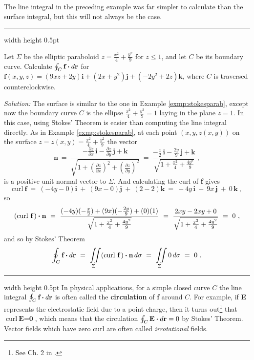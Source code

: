 The line integral in the preceding example was far simpler to calculate than the surface integral, but this will not
always be the case.

\vspace{3mm}
\hrule width \textwidth height 0.5pt
\begin{exmp}
 Let $\Sigma$ be the elliptic paraboloid $z=\frac{x^2}{4}+\frac{y^2}{9}$ for $z \le 1$, and let $C$ be its boundary
 curve.
 Calculate $\oint_{C} \textbf{f} \bm{\cdot} d\textbf{r}$ for $\textbf{f}(x,y,z)=(9xz+2y)\textbf{i}+(2x+y^2 )\textbf{j}+(-2y^2 +2z)\textbf{k}$,
 where $C$ is traversed counterclockwise.\vspace{1mm}
 \par\noindent\emph{Solution:} The surface is similar to the one in Example \ref{exmp:stokesparab}, except now the
 boundary curve $C$ is the ellipse $\frac{x^2}{4}+\frac{y^2}{9}=1$ laying in the plane $z=1$. In this case, using
 Stokes' Theorem is easier than computing the line integral directly. As in Example \ref{exmp:stokesparab}, at each
 point $(x,y,z(x,y))$ on the surface $z=z(x,y)=\frac{x^2}{4}+\frac{y^2}{9}$ the vector
 \begin{displaymath}
  \textbf{n} ~=~
   \frac{-\frac{\partial z}{\partial x}\,\textbf{i} - \frac{\partial z}{\partial y}\,\textbf{j} +
   \textbf{k}}{\sqrt{1 + \left( \tfrac{\partial z}{\partial x} \right)^2 +
   \left( \tfrac{\partial z}{\partial y} \right)^2}} ~=~
   \frac{-\tfrac{x}{2}\,\textbf{i} - \tfrac{2y}{9}\,\textbf{j} + \textbf{k}}{\sqrt{1 +\tfrac{x^2}{4}+
    \tfrac{4y^2}{9}}} ~,
 \end{displaymath}
 is a positive unit normal vector to $\Sigma$. And calculating the curl of \textbf{f} gives
 \begin{displaymath}
  \text{curl}~\textbf{f} ~=~ (-4y-0)\textbf{i} ~+~ (9x-0)\textbf{j} ~+~ (2-2)\textbf{k} ~=~ -4y\,\textbf{i} ~+~ 9x\,\textbf{j} ~+~
   0\,\textbf{k}~,
 \end{displaymath}
 so
 \begin{displaymath}
  (\text{curl}~{\textbf{f}}\,) \bm{\cdot} \textbf{n} ~=~ \frac{(-4y)(-\tfrac{x}{2})+(9x)(-\tfrac{2y}{9})+
   (0)(1)}{\sqrt{1 +\tfrac{x^2}{4}+\tfrac{4y^2}{9}}} ~=~ \frac{2xy-2xy+0}{\sqrt{1 +\tfrac{x^2}{4}+\tfrac{4y^2}{9}}} ~=~ 0~,
 \end{displaymath}
 and so by Stokes' Theorem
 \begin{displaymath}
  \oint_{C} \textbf{f} \bm{\cdot} d\textbf{r} ~=~ \iint\limits_{\Sigma} (\text{curl}~{\textbf{f}}\,) \bm{\cdot} \textbf{n}\,d\sigma ~=~
   \iint\limits_{\Sigma} 0\,d\sigma ~=~ 0 ~.
 \end{displaymath}
\end{exmp}
\hrule width \textwidth height 0.5pt
\newpage
In physical applications, for a simple closed curve $C$ the line integral $\oint_{C} \textbf{f} \bm{\cdot} d\textbf{r}$
is often called the \textbf{circulation} of \textbf{f} around $C$. For example, if \textbf{E}
represents the electrostatic field due to a point charge, then
it turns out\footnote{See Ch. 2 in \cite{rmc}.} that $\text{curl}~\textbf{E} = \textbf{0}$, which means that the
circulation $\oint_{C} \textbf{E} \bm{\cdot} d\textbf{r}=0$ by Stokes' Theorem. Vector fields which have zero curl are often called
\emph{irrotational} fields.

